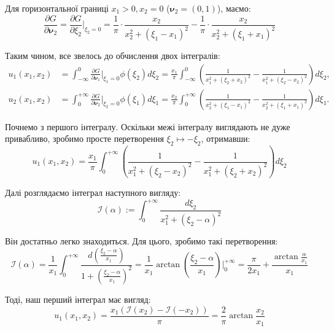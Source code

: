 \documentclass{hw_template}
\begin{document}
Для горизонтальної границі $x_1>0,x_2=0$ ($\boldsymbol{\nu}_2=(0,1)$), маємо:
\begin{equation*}
    \frac{\partial G}{\partial \boldsymbol{\nu}_2} = \frac{\partial G}{\partial \xi_2}\Big|_{\xi_2=0} = \frac{1}{\pi}\cdot\frac{x_2}{x_2^2+(\xi_1-x_1)^2} - \frac{1}{\pi}\cdot\frac{x_2}{x_2^2+(\xi_1+x_1)^2}
\end{equation*}

Таким чином, все звелось до обчислення двох інтегралів:
\begin{align*}
    u_1(x_1,x_2) &= \int_{-\infty}^{0}\frac{\partial G}{\partial \boldsymbol{\nu}_1}\Big|_{\xi_1=0}\phi(\xi_2)d\xi_2 = \frac{x_1}{\pi}\int_{-\infty}^{0}\left(\frac{1}{x_1^2+(\xi_2+x_2)^2} - \frac{1}{x_1^2+(\xi_2-x_2)^2}\right)d\xi_2, \\
    u_2(x_1,x_2) &= \int_0^{+\infty}\frac{\partial G}{\partial \boldsymbol{\nu}_2}\Big|_{\xi_2=0}\phi(\xi_1)d\xi_1 = \frac{x_2}{\pi}\int_{0}^{+\infty}\left(\frac{1}{x_2^2+(\xi_1-x_1)^2} - \frac{1}{x_2^2+(\xi_1+x_1)^2}\right)d\xi_1.
\end{align*}

Почнемо з першого інтегралу. Оскільки межі інтегралу виглядають не дуже привабливо, зробимо просте перетворення $\xi_2 \mapsto -\xi_2$, отримавши:
\begin{equation*}
    u_1(x_1,x_2) = \frac{x_1}{\pi}\int_{0}^{+\infty}\left(\frac{1}{x_1^2+(\xi_2-x_2)^2} - \frac{1}{x_1^2+(\xi_2+x_2)^2}\right)d\xi_2
\end{equation*}

Далі розглядаємо інтеграл наступного вигляду:
\begin{equation*}
    \mathcal{I}(\alpha) := \int_0^{+\infty} \frac{d\xi_2}{x_1^2+(\xi_2-\alpha)^2}
\end{equation*}

Він достатньо легко знаходиться. Для цього, зробимо такі перетворення:
\begin{equation*}
    \mathcal{I}(\alpha) =\frac{1}{x_1}\int_0^{+\infty} \frac{d\left(\frac{\xi_2-\alpha}{x_1}\right)}{1+\left(\frac{\xi_2-\alpha}{x_1}\right)^2} = \frac{1}{x_1}\arctan \left(\frac{\xi_2-\alpha}{x_1}\right)\Big|_0^{+\infty} = \frac{\pi}{2x_1} + \frac{\arctan \frac{\alpha}{x_1}}{x_1}
\end{equation*}

Тоді, наш перший інтеграл має вигляд:
\begin{equation*}
    u_1(x_1,x_2) = \frac{x_1(\mathcal{I}(x_2) - \mathcal{I}(-x_2))}{\pi} = \frac{2}{\pi}\arctan \frac{x_2}{x_1}
\end{equation*}
\end{document}
